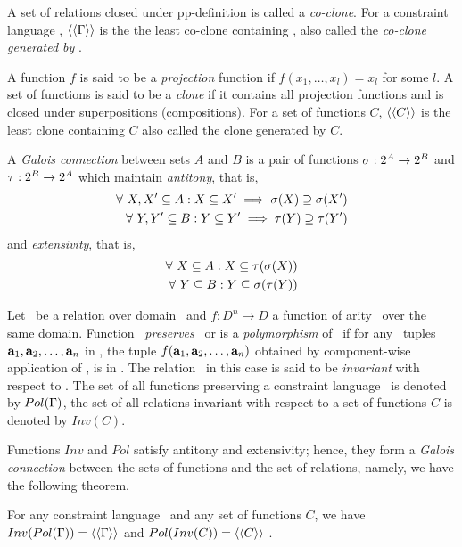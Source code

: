 A set of relations closed under pp-definition is called a \emph{co-clone}.
For a constraint language \mrelset, \(\langle\langle \Gamma \rangle\rangle\) is the the least co-clone containing
\mrelset, also called the \emph{co-clone generated by \mrelset}\@.

A function \(f\) is said to be a \emph{projection} function if \(f(x_1,\dotsc,x_l)=x_l\) 
for some \(l\)\@.
A set of functions is said to be a \emph{clone} if it contains all projection
functions and is closed under superpositions (compositions). For a set of functions
\(C\), \(\langle\langle C \rangle\rangle\) is the least clone containing \(C\) also called the clone generated by \(C\)\@.

A \emph{Galois connection} between sets \(A\) and \(B\) is a pair of functions
\(\sigma:2^{A} \to 2^{B}\) and \(\tau:2^{B} \to 2^{A}\) 
which maintain {\em antitony}, that is,
\begin{align*}
\forall~X,X' \subseteq A: X \subseteq X' \implies \sigma(X) \supseteq \sigma(X') \\
\forall~Y,Y'\subseteq B: Y \subseteq Y' \implies \tau(Y) \supseteq \tau(Y') \\
\end{align*}
and {\em extensivity}, that is,
\begin{align*}
\forall~X\subseteq A:X \subseteq \tau(\sigma(X)) \\
\forall~Y\subseteq B:Y \subseteq \sigma(\tau(Y))
\end{align*}

Let \mR\ be a relation over domain \mD\ and \(f:D^n\to D\) a function of arity \mn\ over the
same domain. Function \mf\ \emph{preserves} \mR\ or is a \emph{polymorphism} of \mR\ if
for any \mn\ tuples \(\textbf{a}_1,\textbf{a}_2,\dotsc,\textbf{a}_n\) in \mR, the tuple
\(f(\textbf{a}_1,\textbf{a}_2,\dotsc,\textbf{a}_n)\) obtained by component-wise application of \mf,
is in \mR\@. The relation \mR\ in this case is said to be \emph{invariant} with respect 
to \mf\@.
The set of all functions preserving a constraint language \mrelset\ is 
denoted by \(Pol(\Gamma)\), the set of all relations invariant with respect to a set of
functions  \(C\) is denoted by \(Inv(C)\)\@.

Functions \(Inv\) and \(Pol\) satisfy antitony and extensivity; hence, they 
form a \emph{Galois connection} between the sets of functions 
and the set of relations, namely, we have the following theorem.

\begin{theorem}
For any constraint language \mrelset\ and 
any set of functions \(C\), 
we have \(Inv(Pol(\Gamma))=\langle\langle \Gamma \rangle\rangle\)
and
\(Pol(Inv(C))=\langle\langle C \rangle\rangle\)
\@.
\end{theorem}

